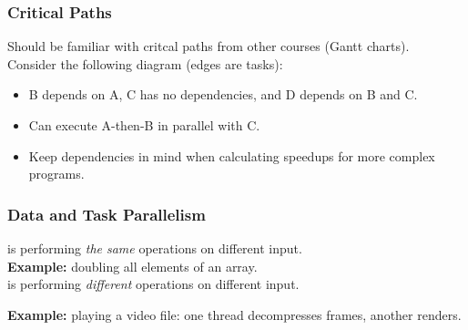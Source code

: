 \documentclass[aspectratio=43]{beamer}
\newenvironment{changemargin}[1]{%
  \begin{list}{}{%
    \setlength{\topsep}{0pt}%
    \setlength{\leftmargin}{#1}%
    \setlength{\rightmargin}{1em}
    \setlength{\listparindent}{\parindent}%
    \setlength{\itemindent}{\parindent}%
    \setlength{\parsep}{\parskip}%
  }%
  \item[]}{\end{list}}
\begin{document}
\begin{frame}
  \frametitle{Critical Paths}

  \begin{changemargin}{2.5cm}

  Should be familiar with critcal paths from other courses (Gantt charts).\\[1em]

  Consider the following diagram (edges are tasks):

\begin{center}
\end{center}

  \begin{itemize}
    \item B depends on A, C has no dependencies, and D depends on B and C.
    \item Can execute A-then-B in parallel with C.
    \item Keep dependencies in mind when calculating speedups for more
      complex programs.
  \end{itemize}
  \end{changemargin}
\end{frame}

\begin{frame}
  \frametitle{Data and Task Parallelism}

  \begin{changemargin}{2.5cm}
      is performing \emph{the same} operations on
      different input.\\

     {\bf Example:} doubling all elements of an array.\\[1em]

      is performing \emph{different} operations
      on different input.

    {\bf Example:} playing a video file: one thread decompresses
      frames, another renders.

  \end{changemargin}
\end{frame}
\end{document}

